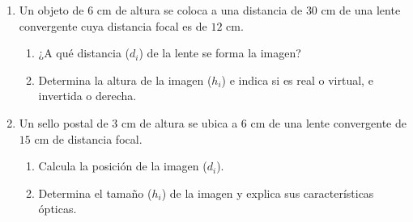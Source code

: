 \documentclass[11pt, letterpaper]{article}
\newif\ifshowanswers
\newcommand{\answer}[1]{ 
	\ifshowanswers 
	\par\vspace{0.15cm} 
	\begin{tcolorbox}[colback=blue!5!white, colframe=blue!60!white, arc=1mm, boxrule=0.5pt, title=\textbf{\footnotesize SOLUCIÓN PASO A PASO (DOCENTE)}] 
		\color{blue!80!black}\footnotesize #1 
	\end{tcolorbox} 
	\par\vspace{0.15cm} 
	\else 
	\par\vspace{0.3cm} 
	\fi 
}
\begin{document}
\begin{enumerate}[leftmargin=*, itemsep=0.8cm]
		\item  Un objeto de $6\text{ cm}$ de altura se coloca a una distancia de $30\text{ cm}$ de una lente convergente cuya distancia focal es de $12\text{ cm}$. 
		\begin{enumerate}[label=\alph*), itemsep=0.2cm] 
			\item ¿A qué distancia ($d_i$) de la lente se forma la imagen? 
			\item Determina la altura de la imagen ($h_i$) e indica si es real o virtual, e invertida o derecha. 
		\end{enumerate} 
		\answer{ 
			a) $\frac{1}{f} = \frac{1}{d_o} + \frac{1}{d_i} \implies \frac{1}{12} = \frac{1}{30} + \frac{1}{d_i} \implies \frac{1}{d_i} = \frac{1}{12} - \frac{1}{30} = \frac{3}{60} = \frac{1}{20} \implies d_i = \mathbf{20\text{ cm}}$.\\[0.1cm] 
			b) Aumento: $A = -\frac{d_i}{d_o} = -\frac{20}{30} = -\frac{2}{3}$.\\ 
			Altura: $h_i = \left(-\frac{2}{3}\right) \cdot 6\text{ cm} = \mathbf{-4\text{ cm}}$.\\ 
			\textbf{Características:} La imagen es \textbf{real} ($d_i > 0$), \textbf{invertida} ($h_i < 0$) y reducida ($4\text{ cm} < 6\text{ cm}$). 
		} 
		
		\item  Un sello postal de $3\text{ cm}$ de altura se ubica a $6\text{ cm}$ de una lente convergente de $15\text{ cm}$ de distancia focal. 
		\begin{enumerate}[label=\alph*), itemsep=0.2cm] 
			\item Calcula la posición de la imagen ($d_i$). 
			\item Determina el tamaño ($h_i$) de la imagen y explica sus características ópticas. 
		\end{enumerate} 
		\answer{ 
			a) $\frac{1}{15} = \frac{1}{6} + \frac{1}{d_i} \implies \frac{1}{d_i} = \frac{1}{15} - \frac{1}{6} = \frac{-3}{30} = -\frac{1}{10} \implies d_i = \mathbf{-10\text{ cm}}$.\\[0.1cm] 
			b) Aumento: $A = -\frac{-10}{6} = +\frac{5}{3}$. Altura: $h_i = \left(\frac{5}{3}\right) \cdot 3\text{ cm} = \mathbf{+5\text{ cm}}$.\\ 
			\textbf{Características:} La imagen es \textbf{virtual} ($d_i < 0$), \textbf{derecha} ($h_i > 0$) y ampliada ($5\text{ cm} > 3\text{ cm}$). 
		} 
		

\end{enumerate}
\end{document}
